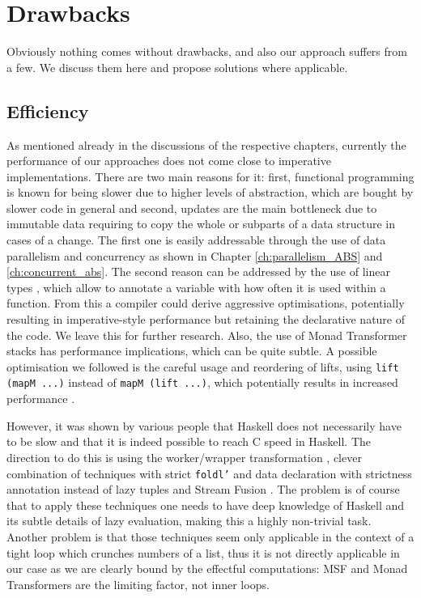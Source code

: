 \section{Drawbacks}
\label{sec:drawbacks}
Obviously nothing comes without drawbacks, and also our approach suffers from a few. We discuss them here and propose solutions where applicable.

\subsection{Efficiency}
\label{sec:drawback_efficiency}
As mentioned already in the discussions of the respective chapters, currently the performance of our approaches does not come close to imperative implementations. There are two main reasons for it: first, functional programming is known for being slower due to higher levels of abstraction, which are bought by slower code in general and second, updates are the main bottleneck due to immutable data requiring to copy the whole or subparts of a data structure in cases of a change. The first one is easily addressable through the use of data parallelism and concurrency as shown in Chapter \ref{ch:parallelism_ABS} and \ref{ch:concurrent_abs}. The second reason can be addressed by the use of linear types \cite{bernardy_linear_2017}, which allow to annotate a variable with how often it is used within a function. From this a compiler could derive aggressive optimisations, potentially resulting in imperative-style performance but retaining the declarative nature of the code. We leave this for further research. Also, the use of Monad Transformer stacks has performance implications, which can be quite subtle. A possible optimisation we followed is the careful usage and reordering of lifts, using \texttt{lift (mapM ...)} instead of \texttt{mapM (lift ...)}, which potentially results in increased performance .

However, it was shown by various people \cite{kqr_competing_2017, stewart_haskell_2008, stolarek_haskell_2013} that Haskell does not necessarily have to be slow and that it is indeed possible to reach C speed in Haskell. The direction to do this is using the worker/wrapper transformation \cite{gill_worker/wrapper_2009}, clever combination of techniques with strict \texttt{foldl'} and data declaration with strictness annotation instead of lazy tuples and Stream Fusion \cite{coutts_stream_2007, mainland_haskell_2013}. The problem is of course that to apply these techniques one needs to have deep knowledge of Haskell and its subtle details of lazy evaluation, making this a highly non-trivial task. Another problem is that those techniques seem only applicable in the context of a tight loop which crunches numbers of a list, thus it is not directly applicable in our case as we are clearly bound by the effectful computations: MSF and Monad Transformers are the limiting factor, not inner loops.

